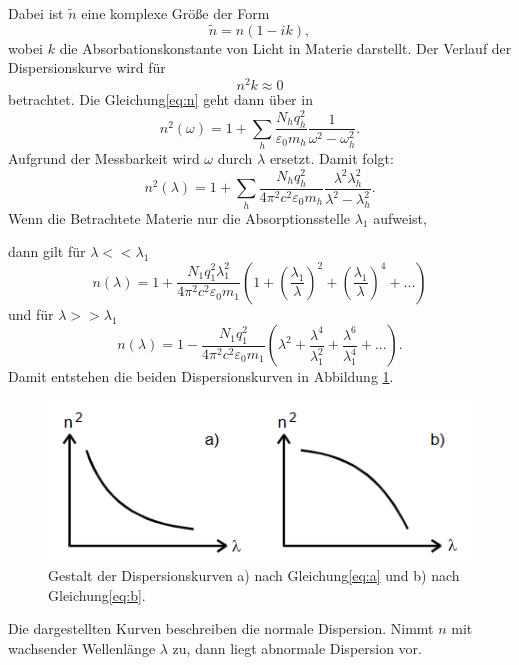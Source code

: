 Dabei ist $\tilde{n}$ eine komplexe Größe der Form
\begin{equation}
  \tilde{n} = n(1 - ik) ,
\end{equation}
wobei $k$ die Absorbationskonstante von Licht in Materie darstellt.
Der Verlauf der Dispersionskurve wird für
\begin{equation}
  n^2 k \approx 0
\end{equation}
betrachtet.
Die Gleichung\eqref{eq:n} geht dann über in
\begin{equation}
  n^2 (\omega) = 1 + \sum_{h} \frac{N_h q_h ^2}{\varepsilon_0 m_h}\frac {1}{\omega ^2 -\omega_h ^2} .
\end{equation}
Aufgrund der Messbarkeit wird $\omega$ durch $\lambda$ ersetzt.
Damit folgt:
\begin{equation}
  n^2 (\lambda) = 1 + \sum_{h} \frac{N_h q_h ^2}{4 \pi^2 c^2 \varepsilon_0 m_h}\frac{\lambda^2\lambda_h ^2}{\lambda^2 - \lambda_h ^2} .
\end{equation}
Wenn die Betrachtete Materie nur die Absorptionsstelle $\lambda_1$ aufweist,

\noindent dann gilt für $\lambda << \lambda_1$
\begin{equation}
  \label{eq:a}
  n(\lambda) = 1 + \frac{N_1 q_1 ^2 \lambda_1 ^2}{4 \pi^2 c^2 \varepsilon_0 m_1}(1 + (\frac{\lambda_1}{\lambda})^2 + (\frac{\lambda_1}{\lambda})^4 + ...)
\end{equation}
und für $\lambda >> \lambda_1$
\begin{equation}
  \label{eq:b}
  n(\lambda) = 1 - \frac{N_1 q_1 ^2 }{4 \pi^2 c^2 \varepsilon_0 m_1}(\lambda^2+ \frac{\lambda^4}{\lambda_1 ^2} + \frac{\lambda^6}{\lambda_1 ^4} + ...)  .
\end{equation}
Damit entstehen die beiden Dispersionskurven in Abbildung \ref{fig:disp}.
\begin{figure}[H]
  \centering
  \includegraphics{content/disp.png}
  \caption{Gestalt der Dispersionskurven a) nach Gleichung\eqref{eq:a} und b) nach Gleichung\eqref{eq:b}\cite{v402}.}
  \label{fig:disp}
\end{figure}
\noindent Die dargestellten Kurven beschreiben die normale Dispersion.
Nimmt $n$ mit wachsender Wellenlänge $\lambda$ zu, dann liegt abnormale Dispersion vor.
